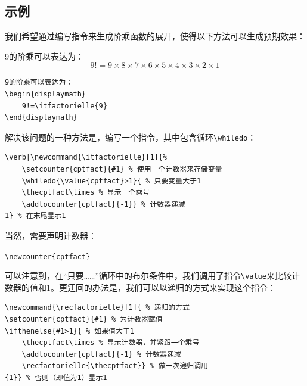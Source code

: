 \subsection{示例}

我们希望通过编写指令来生成阶乘函数的展开，使得以下方法可以生成预期效果：

\begin{codelist}[9.9]{
    9的阶乘可以表达为：
    \begin{displaymath}
        9!=9\times 8\times 7\times 6\times 5\times 4\times 3\times 2\times 1
    \end{displaymath}
}\begin{verbatim}
9的阶乘可以表达为：
\begin{displaymath}
    9!=\itfactorielle{9}
\end{displaymath}
\end{verbatim}
\end{codelist}

解决该问题的一种方法是，编写一个指令，其中包含循环\verb|\whiledo|：

\begin{dmd}
    \begin{verbatim}
\verb|\newcommand{\itfactorielle}[1]{%
    \setcounter{cptfact}{#1} % 使用一个计数器来存储变量
    \whiledo{\value{cptfact}>1}{ % 只要变量大于1
    \thecptfact\times % 显示一个乘号
    \addtocounter{cptfact}{-1}} % 计数器递减
1} % 在末尾显示1
    \end{verbatim}
\end{dmd}

当然，需要声明计数器：

\begin{dmd}
\verb+\newcounter{cptfact}+
\end{dmd}

可以注意到，在“只要……”循环中的布尔条件中，我们调用了指令\verb|\value|来比较计数器的值和1。更迂回的办法是，我们可以以递归的方式来实现这个指令：

\begin{dmd}
\begin{verbatim}
\newcommand{\recfactorielle}[1]{ % 递归的方式
\setcounter{cptfact}{#1} % 为计数器赋值
\ifthenelse{#1>1}{ % 如果值大于1
    \thecptfact\times % 显示计数器，并紧跟一个乘号
    \addtocounter{cptfact}{-1} % 计数器递减
    \recfactorielle{\thecptfact}} % 做一次递归调用
{1}} % 否则（即值为1）显示1
\end{verbatim}
\end{dmd}

